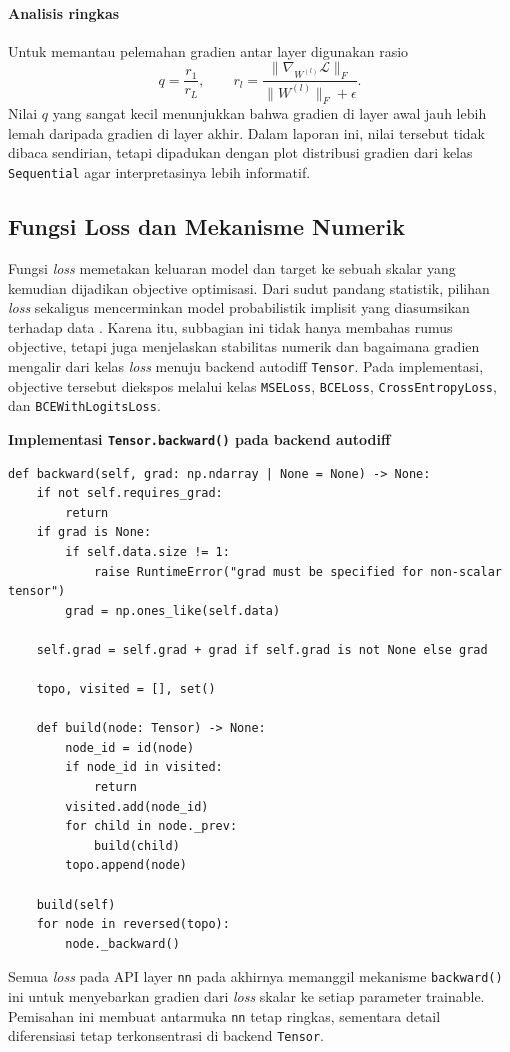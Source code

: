 \documentclass{article}
\begin{document}
\paragraph{Analisis ringkas}
Untuk memantau pelemahan gradien antar layer digunakan rasio
\begin{equation}
q = \frac{r_1}{r_L},
\qquad
r_l=\frac{\|\nabla_{W^{(l)}}\mathcal{L}\|_F}{\|W^{(l)}\|_F+\epsilon}.
\end{equation}
Nilai $q$ yang sangat kecil menunjukkan bahwa gradien di layer awal jauh lebih lemah daripada gradien di layer akhir. Dalam laporan ini, nilai tersebut tidak dibaca sendirian, tetapi dipadukan dengan plot distribusi gradien dari kelas \texttt{Sequential} agar interpretasinya lebih informatif.

\subsection{Fungsi Loss dan Mekanisme Numerik}
\label{subsec:loss}
Fungsi \textit{loss} memetakan keluaran model dan target ke sebuah skalar yang kemudian dijadikan objective optimisasi. Dari sudut pandang statistik, pilihan \textit{loss} sekaligus mencerminkan model probabilistik implisit yang diasumsikan terhadap data \citep{goodfellow2016dl}. Karena itu, subbagian ini tidak hanya membahas rumus objective, tetapi juga menjelaskan stabilitas numerik dan bagaimana gradien mengalir dari kelas \textit{loss} menuju backend autodiff \texttt{Tensor}. Pada implementasi, objective tersebut diekspos melalui kelas \texttt{MSELoss}, \texttt{BCELoss}, \texttt{CrossEntropyLoss}, dan \texttt{BCEWithLogitsLoss}.

\noindent\textbf{Implementasi \texttt{Tensor.backward()} pada backend autodiff}\par
\begin{lstlisting}
def backward(self, grad: np.ndarray | None = None) -> None:
    if not self.requires_grad:
        return
    if grad is None:
        if self.data.size != 1:
            raise RuntimeError("grad must be specified for non-scalar tensor")
        grad = np.ones_like(self.data)

    self.grad = self.grad + grad if self.grad is not None else grad

    topo, visited = [], set()

    def build(node: Tensor) -> None:
        node_id = id(node)
        if node_id in visited:
            return
        visited.add(node_id)
        for child in node._prev:
            build(child)
        topo.append(node)

    build(self)
    for node in reversed(topo):
        node._backward()
\end{lstlisting}
Semua \textit{loss} pada API layer \texttt{nn} pada akhirnya memanggil mekanisme \texttt{backward()} ini untuk menyebarkan gradien dari \textit{loss} skalar ke setiap parameter trainable. Pemisahan ini membuat antarmuka \texttt{nn} tetap ringkas, sementara detail diferensiasi tetap terkonsentrasi di backend \texttt{Tensor}.
\end{document}
